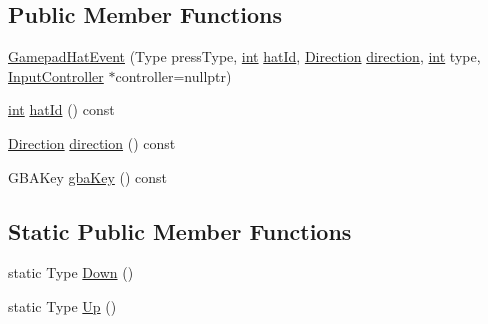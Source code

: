 \subsection*{Public Member Functions}
\begin{DoxyCompactItemize}
\item 
\mbox{\hyperlink{class_q_g_b_a_1_1_gamepad_hat_event_ac940e927086b56db1a2e43b79b18b47e}{Gamepad\+Hat\+Event}} (Type press\+Type, \mbox{\hyperlink{ioapi_8h_a787fa3cf048117ba7123753c1e74fcd6}{int}} \mbox{\hyperlink{class_q_g_b_a_1_1_gamepad_hat_event_a2128bd4e5dd8a0b9c403c1a67adb092f}{hat\+Id}}, \mbox{\hyperlink{class_q_g_b_a_1_1_gamepad_hat_event_ae3f20662c61b054e5344aafb9d843837}{Direction}} \mbox{\hyperlink{class_q_g_b_a_1_1_gamepad_hat_event_ab70c4d31d0decf93df8f0e787945bc76}{direction}}, \mbox{\hyperlink{ioapi_8h_a787fa3cf048117ba7123753c1e74fcd6}{int}} type, \mbox{\hyperlink{class_q_g_b_a_1_1_input_controller}{Input\+Controller}} $\ast$controller=nullptr)
\item 
\mbox{\hyperlink{ioapi_8h_a787fa3cf048117ba7123753c1e74fcd6}{int}} \mbox{\hyperlink{class_q_g_b_a_1_1_gamepad_hat_event_a2128bd4e5dd8a0b9c403c1a67adb092f}{hat\+Id}} () const
\item 
\mbox{\hyperlink{class_q_g_b_a_1_1_gamepad_hat_event_ae3f20662c61b054e5344aafb9d843837}{Direction}} \mbox{\hyperlink{class_q_g_b_a_1_1_gamepad_hat_event_ab70c4d31d0decf93df8f0e787945bc76}{direction}} () const
\item 
G\+B\+A\+Key \mbox{\hyperlink{class_q_g_b_a_1_1_gamepad_hat_event_ae1e5e82556996d69ff9906bbe3e7bf74}{gba\+Key}} () const
\end{DoxyCompactItemize}
\subsection*{Static Public Member Functions}
\begin{DoxyCompactItemize}
\item 
static Type \mbox{\hyperlink{class_q_g_b_a_1_1_gamepad_hat_event_acd067a14064dc04959c60a5c65d74e2c}{Down}} ()
\item 
static Type \mbox{\hyperlink{class_q_g_b_a_1_1_gamepad_hat_event_a50c86094bbd93339a59b231e38bf15b0}{Up}} ()
\end{DoxyCompactItemize}
